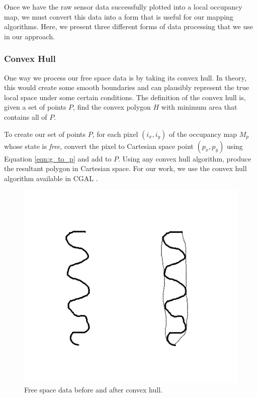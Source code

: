 Once we have the raw sensor data successfully plotted into a local occupancy map, we must convert this data into a form that is useful for our mapping algorithms.  Here, we present three different forms of data processing that we use in our approach.

\subsubsection{Convex Hull}

One way we process our free space data is by taking its convex hull.  In theory, this would create some smooth boundaries and can plausibly represent the true local space under some certain conditions.   The definition of the convex hull is, given a set of points $P$, find the convex polygon $H$ with minimum area that contains all of $P$.

To create our set of points $P$, for each pixel $(i_x,i_y)$ of the occupancy map $M_p$ whose state is \emph{free}, convert the pixel to Cartesian space point $(p_x,p_y)$ using Equation \ref{eqn:g_to_p} and add to $P$.  Using any convex hull algorithm, produce the resultant polygon in Cartesian space.   For our work, we use the convex hull algorithm available in CGAL \cite{cgal:hs-chep2-12b}.

\begin{figure}
  \begin{center}
    \includegraphics[scale=0.9]{4_convex_freespace1.png}
  \end{center}
  \caption{Free space data before and after convex hull.}
	\label{convex_free1}
\end{figure}

